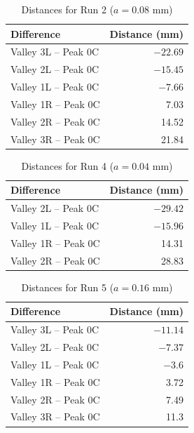 %
\newpage
\begin{table}[ht!]
    \centering
    \begin{tabular}{|l|r|}
        \hline
        Difference & Distance (mm) \\
        \hline
        Valley 3L -- Peak 0C & $-22.69$ \\
        Valley 2L -- Peak 0C & $-15.45$ \\
        Valley 1L -- Peak 0C & $-7.66$ \\
        \hline
        Valley 1R -- Peak 0C & 7.03 \\
        Valley 2R -- Peak 0C & 14.52 \\
        Valley 3R -- Peak 0C & 21.84 \\
        \hline
    \end{tabular}
    \caption{Distances for Run 2 ($a = 0.08$ mm)}
    \label{tablel.11.dis.12}
\end{table}
%
\begin{table}[ht!]
    \centering
    \begin{tabular}{|l|r|}
        \hline
        Difference & Distance (mm) \\
        \hline
        Valley 2L -- Peak 0C & $-29.42$ \\
        Valley 1L -- Peak 0C & $-15.96$ \\
        \hline
        Valley 1R -- Peak 0C & 14.31 \\
        Valley 2R -- Peak 0C & 28.83 \\
        \hline
    \end{tabular}
    \caption{Distances for Run 4 ($a = 0.04$ mm)}
    \label{tablel.11.dis.34}
\end{table}
%
\begin{table}[ht!]
    \centering
    \begin{tabular}{|l|r|}
        \hline
        Difference & Distance (mm) \\
        \hline
        Valley 3L -- Peak 0C & $-11.14$ \\
        Valley 2L -- Peak 0C & $-7.37$ \\
        Valley 1L -- Peak 0C & $-3.6$ \\
        \hline
        Valley 1R -- Peak 0C & 3.72 \\
        Valley 2R -- Peak 0C & 7.49 \\
        Valley 3R -- Peak 0C & 11.3 \\
        \hline
    \end{tabular}
    \caption{Distances for Run 5 ($a = 0.16$ mm)}
    \label{tablel.11.dis.56}
\end{table}

